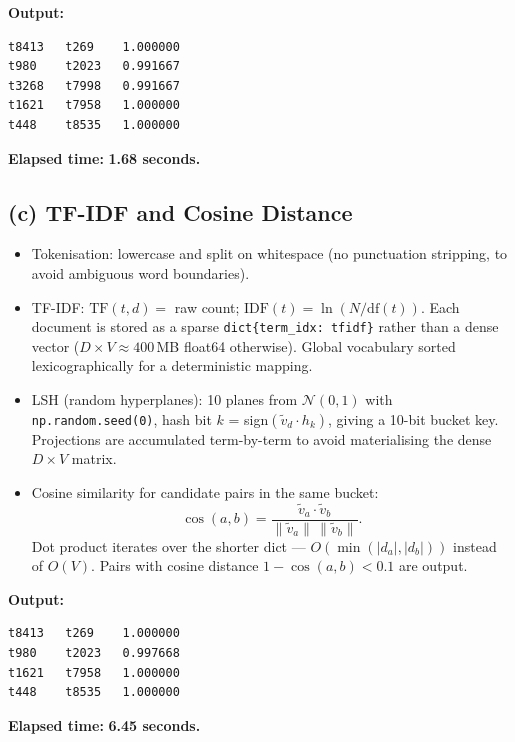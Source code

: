 \documentclass[11pt,a4paper]{article}
\begin{document}
\textbf{Output:}
\begin{lstlisting}
t8413   t269    1.000000
t980    t2023   0.991667
t3268   t7998   0.991667
t1621   t7958   1.000000
t448    t8535   1.000000
\end{lstlisting}

\textbf{Elapsed time:} \textbf{1.68 seconds.}

\subsection*{(c) TF-IDF and Cosine Distance}

\begin{itemize}
  \item Tokenisation: lowercase and split on whitespace (no punctuation stripping,
        to avoid ambiguous word boundaries).

  \item TF-IDF: $\mathrm{TF}(t,d)=$ raw count; $\mathrm{IDF}(t)=\ln(N/\mathrm{df}(t))$.
        Each document is stored as a sparse \texttt{dict\{term\_idx: tfidf\}} rather than
        a dense vector ($D\!\times\!V \approx 400$\,MB float64 otherwise).
        Global vocabulary sorted lexicographically for a deterministic mapping.

  \item LSH (random hyperplanes): 10 planes from $\mathcal{N}(0,1)$ with \texttt{np.random.seed(0)},
        hash bit $k$ = sign$(\tilde{v}_d \cdot h_k)$, giving a 10-bit bucket key.
        Projections are accumulated term-by-term to avoid materialising the dense $D\!\times\!V$ matrix.

  \item Cosine similarity for candidate pairs in the same bucket:
        \[
          \cos(a,b) = \frac{\tilde{v}_a \cdot \tilde{v}_b}{\|\tilde{v}_a\|\,\|\tilde{v}_b\|}.
        \]
        Dot product iterates over the shorter dict — $O(\min(|d_a|,|d_b|))$ instead of $O(V)$.
        Pairs with cosine distance $1-\cos(a,b) < 0.1$ are output.
\end{itemize}

\textbf{Output:}
\begin{lstlisting}
t8413   t269    1.000000
t980    t2023   0.997668
t1621   t7958   1.000000
t448    t8535   1.000000
\end{lstlisting}

\textbf{Elapsed time:} \textbf{6.45 seconds.}
\end{document}
